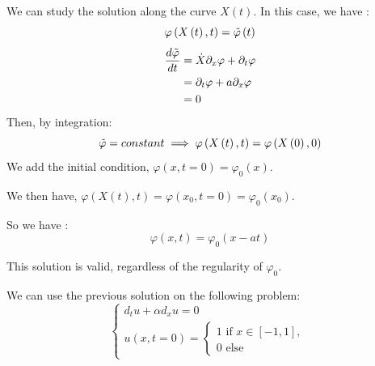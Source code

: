         We can study the solution along the curve $X\left(t\right)$. In this case, we have :
        \begin{equation*}
            \varphi\left(X\left(t\right), t\right) = \Tilde{\varphi}\left(t\right)
        \end{equation*}
        \begin{align*}
            \frac{d\Tilde{\varphi}}{dt} &= \dot X \partial_x\varphi + \partial_t\varphi \\
                                        &= \partial_t\varphi + a\partial_x\varphi\\
                                        &=0
        \end{align*}
        Then, by integration:
        \begin{equation*}
            \Tilde{\varphi} = constant \implies \varphi\left(X\left(t\right), t\right) = \varphi\left(X\left(0\right) , 0\right)
        \end{equation*}
        We add the initial condition, $ \varphi\left(x, t=0\right) = \varphi_0\left(x\right) $.

        We then have, $\varphi\left(X\left(t\right), t\right) = \varphi\left(x_0, t=0\right) = \varphi_0\left(x_0\right)$.

        So we have :
        \begin{equation*}
            \varphi\left(x,t\right) = \varphi_0\left(x- at\right)
        \end{equation*}

        \begin{remark}
            This solution is valid, regardless of the regularity of $\varphi_0$.
        \end{remark}
        
        We can use the previous solution on the following problem:
        \begin{equation*}
            \begin{cases} 
                d_t u + \alpha d_x u = 0\\
                u(x, t=0) = 
                \begin{cases}
                    1 \text{ if } x\in \left[  -1,1\right],\\
                    0 \text{ else}
                \end{cases}
            \end{cases}
        \end{equation*}

        
    

